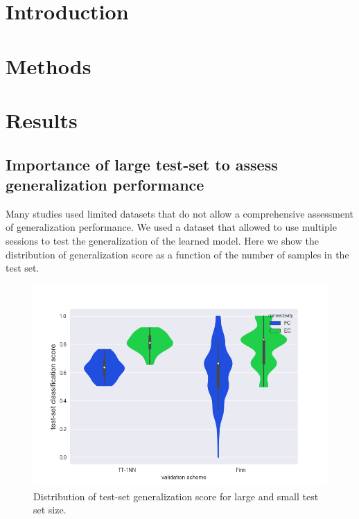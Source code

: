 \documentclass[12pt, a4paper, final, fleqn]{article}
\begin{document}
\newpage
\tableofcontents
\newpage
\section{Introduction}
\label{intro}



\section{Methods}
\label{methods}

\section{Results}
\label{results}

\subsection{Importance of large test-set to assess generalization performance}
Many studies used limited datasets that do not allow a comprehensive assessment of generalization performance.
We used a dataset that allowed to use multiple sessions to test the generalization of the learned model.
Here we show the distribution of generalization score as a function of the number of samples in the test set.
\begin{figure}[!htb]
\begin{center}
\includegraphics[width=0.89\columnwidth]{variability_finn_1nn_violins_hues}
  \caption[Variability of generalization score]{Distribution of test-set generalization score for large and small test set size.
	  \label{fig:variability_score}}
\end{center}
\end{figure}
\end{document}
